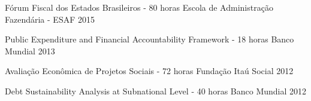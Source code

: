 \begin{cvhonors}
 
  \cvhonor
    {Fórum Fiscal dos Estados Brasileiros - 80 horas}
    {Escola de Administração Fazendária - ESAF}
    {}
    {2015}

  \cvhonor
    {Public Expenditure and Financial Accountability Framework - 18 horas}
    {Banco Mundial}
    {}
    {2013}

  \cvhonor
    {Avaliação Econômica de Projetos Sociais - 72 horas}
    {Fundação Itaú Social}
    {}
    {2012}

\cvhonor
    {Debt Sustainability Analysis at Subnational Level - 40 horas}
    {Banco Mundial}
    {}
    {2012}

\end{cvhonors}